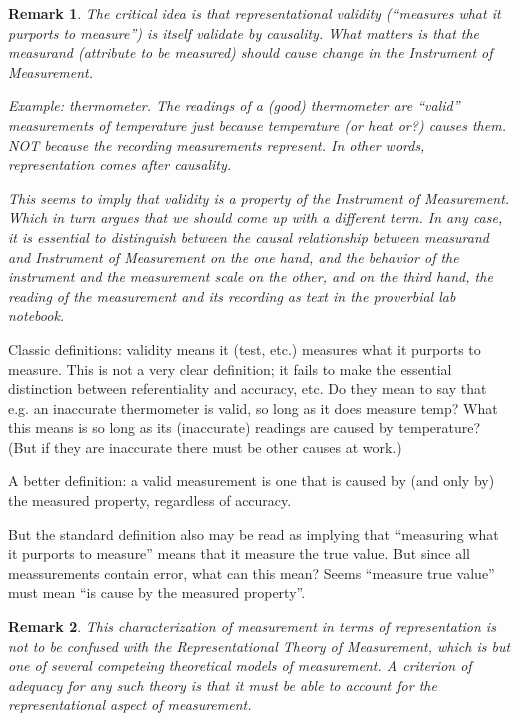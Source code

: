 \documentclass[11pt,twoside]{article}
\newtheorem{remark}{Remark}
\newcommand{\IOM}{Instrument of Measurement}
\begin{document}
\begin{remark}
  The critical idea is that representational validity
  (\enquote{measures what it purports to measure}) is itself validate
  by causality.  What matters is that the measurand (attribute to be
  measured) should \textit{cause} change in the \IOM{}.

  Example: thermometer.  The readings of a (good) thermometer are
  \enquote{valid} measurements of temperature just because temperature
  (or heat or?) \textit{causes} them.  NOT because the recording
  measurements represent.  In other words, representation comes after
  causality.

  This seems to imply that validity is a property of the \IOM{}.
  Which in turn argues that we should come up with a different term.
  In any case, it is essential to distinguish between the causal
  relationship between measurand and \IOM{} on the one hand, and the
  behavior of the instrument and the measurement scale on the other,
  and on the third hand, the reading of the measurement and its
  recording as text in the proverbial lab notebook.
\end{remark}

Classic definitions: validity means it (test, etc.) measures what it
purports to measure.  This is not a very clear definition; it fails to
make the essential distinction between referentiality and accuracy,
etc.  Do they mean to say that e.g. an inaccurate thermometer is
valid, so long as it does measure temp?  What this means is so long as
its (inaccurate) readings are caused by temperature?  (But if they are
inaccurate there must be other causes at work.)

A better definition: a valid measurement is one that is caused by (and
only by) the measured property, regardless of accuracy.

But the standard definition also may be read as implying that
\enquote{measuring what it purports to measure} means that it measure
the true value.  But since all meassurements contain error, what can
this mean?  Seems \enquote{measure true value} must mean \enquote{is
  cause by the measured property}.

\begin{remark}
  This characterization of measurement in terms of representation is
  not to be confused with the Representational Theory of Measurement,
  which is but one of several competeing theoretical models of
  measurement.  A criterion of adequacy for any such theory is that it
  must be able to account for the representational aspect of
  measurement.
\end{remark}
\end{document}
